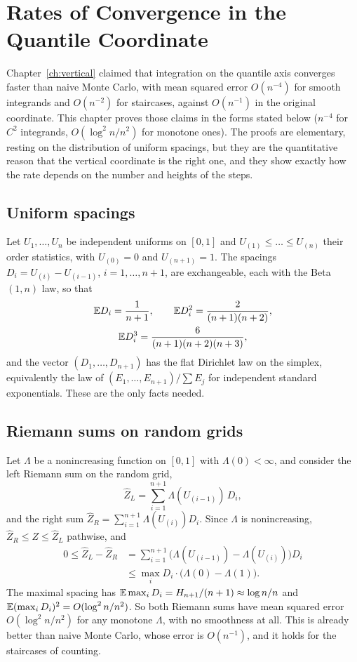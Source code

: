 \chapter{Rates of Convergence in the Quantile Coordinate}
\label{ch:rates}

Chapter~\ref{ch:vertical} claimed that integration on the quantile axis converges faster than naive Monte Carlo, with mean squared error $O(n^{-4})$ for smooth integrands and $O(n^{-2})$ for staircases, against $O(n^{-1})$ in the original coordinate. This chapter proves those claims in the forms stated below ($n^{-4}$ for $C^2$ integrands, $O(\log^2 n / n^2)$ for monotone ones). The proofs are elementary, resting on the distribution of uniform spacings, but they are the quantitative reason that the vertical coordinate is the right one, and they show exactly how the rate depends on the number and heights of the steps.

\section{Uniform spacings}

Let $U_1, \dots, U_n$ be independent uniforms on $[0,1]$ and $U_{(1)} \le \dots \le U_{(n)}$ their order statistics, with $U_{(0)} = 0$ and $U_{(n+1)} = 1$. The spacings $D_i = U_{(i)} - U_{(i-1)}$, $i = 1, \dots, n+1$, are exchangeable, each with the Beta$(1, n)$ law, so that
\[
\begin{gathered}
\mathbb{E} D_i = \frac{1}{n+1} , \qquad \mathbb{E} D_i^2 = \frac{2}{(n+1)(n+2)} , \\
\mathbb{E} D_i^3 = \frac{6}{(n+1)(n+2)(n+3)} ,
\end{gathered}
\]
and the vector $(D_1, \dots, D_{n+1})$ has the flat Dirichlet law on the simplex, equivalently the law of $(E_1, \dots, E_{n+1}) / \sum E_j$ for independent standard exponentials. These are the only facts needed.

\section{Riemann sums on random grids}

Let $\Lambda$ be a nonincreasing function on $[0, 1]$ with $\Lambda(0) < \infty$, and consider the left Riemann sum on the random grid,
\[
\hat Z_L = \sum_{i=1}^{n+1} \Lambda(U_{(i-1)}) \, D_i ,
\]
and the right sum $\hat Z_R = \sum_{i=1}^{n+1} \Lambda(U_{(i)}) D_i$. Since $\Lambda$ is nonincreasing, $\hat Z_R \le Z \le \hat Z_L$ pathwise, and
\[
\begin{aligned}
0 \le \hat Z_L - \hat Z_R &= \sum_{i=1}^{n+1} \big( \Lambda(U_{(i-1)}) - \Lambda(U_{(i)}) \big) D_i \\ &\le \max_i D_i \cdot \big( \Lambda(0) - \Lambda(1) \big) .
\end{aligned}
\]
The maximal spacing has $\mathbb{E} \max_i D_i = H_{n+1} / (n+1) \approx \log n / n$ and $\mathbb{E} (\max_i D_i)^2 = O(\log^2 n / n^2)$. So both Riemann sums have mean squared error $O(\log^2 n / n^2)$ for any monotone $\Lambda$, with no smoothness at all. This is already better than naive Monte Carlo, whose error is $O(n^{-1})$, and it holds for the staircases of counting.

